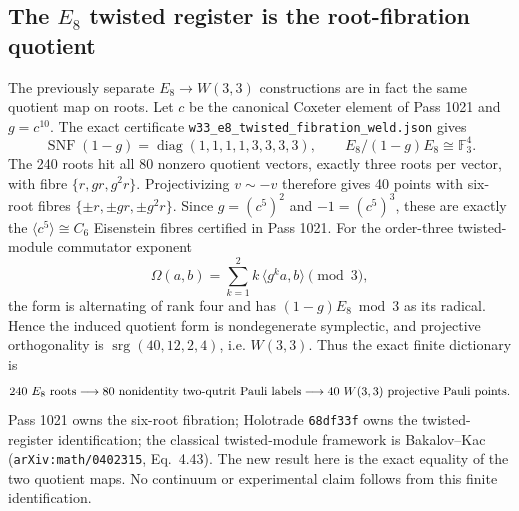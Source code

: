 \subsection{The $E_8$ twisted register is the root-fibration quotient}
The previously separate $E_8\to W(3,3)$ constructions are in fact the same
quotient map on roots.  Let $c$ be the canonical Coxeter element of Pass 1021
and $g=c^{10}$.  The exact certificate
\texttt{w33\_e8\_twisted\_fibration\_weld.json} gives
\[
 \operatorname{SNF}(1-g)=
 \operatorname{diag}(1,1,1,1,3,3,3,3),
 \qquad
 E_8/(1-g)E_8\cong\mathbb F_3^4.
\]
The 240 roots hit all 80 nonzero quotient vectors, exactly three roots per
vector, with fibre $\{r,gr,g^2r\}$.  Projectivizing $v\sim -v$ therefore gives
40 points with six-root fibres
$\{\pm r,\pm gr,\pm g^2r\}$.  Since
$g=(c^5)^2$ and $-1=(c^5)^3$, these are exactly the
$\langle c^5\rangle\cong C_6$ Eisenstein fibres certified in Pass 1021.
For the order-three twisted-module commutator exponent
\[
 \Omega(a,b)=\sum_{k=1}^{2}k\,\langle g^k a,b\rangle\pmod 3,
\]
the form is alternating of rank four and has
$(1-g)E_8\bmod3$ as its radical.  Hence the induced quotient form is
nondegenerate symplectic, and projective orthogonality is
$\operatorname{srg}(40,12,2,4)$, i.e. $W(3,3)$.
Thus the exact finite dictionary is
\[
 240\ E_8\hbox{ roots}\longrightarrow
 80\hbox{ nonidentity two-qutrit Pauli labels}\longrightarrow
 40\ W(3,3)\hbox{ projective Pauli points}.
\]
Pass 1021 owns the six-root fibration; Holotrade \texttt{68df33f} owns the
twisted-register identification; the classical twisted-module framework is
Bakalov--Kac (\texttt{arXiv:math/0402315}, Eq.~4.43).  The new result here is
the exact equality of the two quotient maps.  No continuum or experimental
claim follows from this finite identification.
